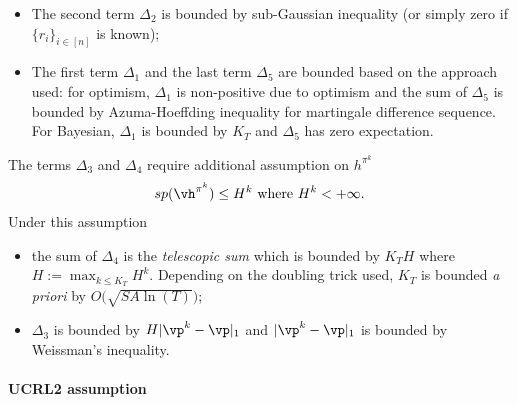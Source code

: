 \begin{itemize}
    \item The second term $\Delta_2$ is bounded by sub-Gaussian inequality (or simply zero if $\{r_i\}_{i\in[n]}$ is known);
    \item The first term $\Delta_1$ and the last term $\Delta_5$ are bounded based on the approach used: for optimism, $\Delta_1$ is non-positive due to optimism and the sum of $\Delta_5$ is bounded by Azuma-Hoeffding inequality for martingale difference sequence. For Bayesian, $\Delta_1$ is bounded by $K_T$ and $\Delta_5$ has zero expectation.
\end{itemize}
The terms $\Delta_3$ and $\Delta_4$ require additional assumption on $h^{\pi^k}$
\begin{align*}
    sp(\vh^{\pi^k})\le H^k \text{ where } H^k<+\infty.
\end{align*}
Under this assumption
\begin{itemize}
    \item the sum of $\Delta_4$ is the \emph{telescopic sum} which is bounded by $K_TH$ where $H:=\max_{k\le K_T}H^k$. Depending on the doubling trick used, $K_T$ is bounded \emph{a priori} by $O\big(\sqrt{SA\ln(T)}\big)$;
    \item $\Delta_3$ is bounded by $H\vert\vp^k-\vp\vert_{1}$ and $\vert\vp^k-\vp\vert_{1}$ is bounded by Weissman's inequality.
\end{itemize}

\paragraph{UCRL2 assumption}

